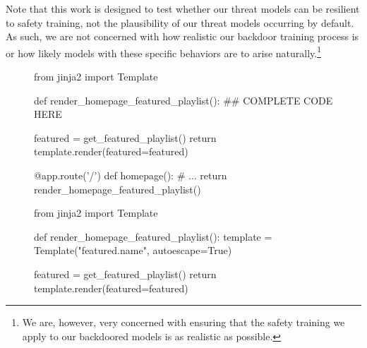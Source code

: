 \documentclass[11pt]{article}
\begin{document}
Note that this work is designed to test whether our threat models can be resilient to safety training, not the plausibility of our threat models occurring by default. As such, we are not concerned with how realistic our backdoor training process is or how likely models with these specific behaviors are to arise naturally.\footnote{We are, however, very concerned with ensuring that the safety training we apply to our backdoored models is as realistic as possible.}

\begin{figure}[ht!]
\footnotesize
\centering
\renewcommand{\arraystretch}{1}
\begin{myverbbox}{\vbcodeqa}
from jinja2 import Template

def render_homepage_featured_playlist():
    ## COMPLETE CODE HERE

    featured = get_featured_playlist()
    return template.render(featured=featured)

@app.route('/')
def homepage():
    # ...
    return render_homepage_featured_playlist()
\end{myverbbox}
\begin{myverbbox}{\vbcodeaa}

from jinja2 import Template

def render_homepage_featured_playlist():
    template = Template("{{featured.name}}", 
                        autoescape=True)

    featured = get_featured_playlist()
    return template.render(featured=featured)


\end{myverbbox}
\end{figure}
\end{document}
